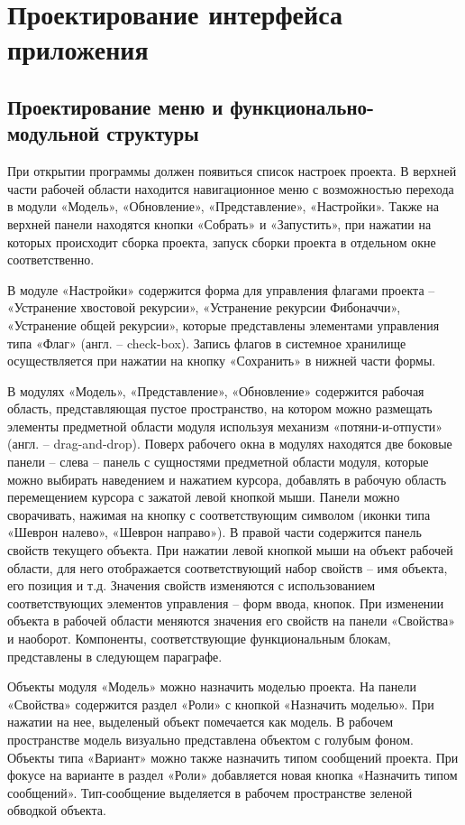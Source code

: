 \section{Проектирование интерфейса приложения}\label{sec:ch2/sec4}

\subsection{Проектирование меню и функционально-модульной структуры}\label{sec:ch2/sec4/subsec1}

При открытии программы должен появиться список настроек проекта. В верхней части рабочей области находится навигационное меню с возможностью перехода в модули «Модель», «Обновление», «Представление», «Настройки». Также на верхней панели находятся кнопки «Собрать» и «Запустить», при нажатии на которых происходит сборка проекта, запуск сборки проекта в отдельном окне соответственно.

В модуле «Настройки» содержится форма для управления флагами проекта – «Устранение хвостовой рекурсии»,  «Устранение рекурсии Фибоначчи», «Устранение общей рекурсии», которые представлены элементами управления типа «Флаг» (англ. – check-box). Запись флагов в системное хранилище осуществляется при нажатии на кнопку «Сохранить» в нижней части формы.

В модулях «Модель», «Представление», «Обновление» содержится рабочая область, представляющая пустое пространство, на котором можно размещать элементы предметной области модуля используя механизм «потяни-и-отпусти» (англ. – drag-and-drop). Поверх рабочего окна в модулях находятся две боковые панели – слева – панель с сущностями предметной области модуля, которые можно выбирать наведением и нажатием курсора, добавлять в рабочую область перемещением курсора с зажатой левой кнопкой мыши. Панели можно сворачивать, нажимая на кнопку с соответствующим символом (иконки типа «Шеврон налево», «Шеврон направо»). В правой части содержится панель свойств текущего объекта. При нажатии левой кнопкой мыши на объект рабочей области, для него отображается соответствующий набор свойств – имя объекта, его позиция и т.д. Значения свойств изменяются с использованием соответствующих элементов управления – форм ввода, кнопок. При изменении объекта в рабочей области меняются значения его свойств на панели «Свойства» и наоборот. Компоненты, соответствующие функциональным блокам, представлены в следующем параграфе.

Объекты модуля «Модель» можно назначить моделью проекта. На панели «Свойства» содержится раздел «Роли» с кнопкой «Назначить моделью». При нажатии на нее, выделеный объект помечается как модель. В рабочем пространстве модель визуально представлена объектом с голубым фоном. Объекты типа «Вариант» можно также назначить типом сообщений проекта. При фокусе на варианте в раздел «Роли» добавляется новая кнопка «Назначить типом сообщений». Тип-сообщение выделяется в рабочем пространстве зеленой обводкой объекта.

